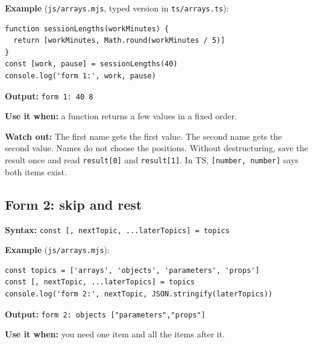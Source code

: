 \documentclass[
  10pt,
  a4paper,
]{article}
\begin{document}
\textbf{Example} (\texttt{js/\allowbreak{}arrays.\allowbreak{}mjs},
typed version in \texttt{ts/\allowbreak{}arrays.\allowbreak{}ts}):

\begin{minipage}{\linewidth}

\begin{lstlisting}
function sessionLengths(workMinutes) {
  return [workMinutes, Math.round(workMinutes / 5)]
}
const [work, pause] = sessionLengths(40)
console.log('form 1:', work, pause)
\end{lstlisting}

\end{minipage}\par

\textbf{Output:} \texttt{form 1:\allowbreak{} 40 8}

\textbf{Use it when:} a function returns a few values in a fixed order.

\textbf{Watch out:} The first name gets the first value. The second name
gets the second value. Names do not choose the positions. Without
destructuring, save the result once and read \texttt{result[0]} and
\texttt{result[1]}. In TS, \texttt{[number, number]} says both items
exist.

\subsection{Form 2: skip and rest}\label{form-2-skip-and-rest}

\textbf{Syntax:}
\texttt{const [, nextTopic, .\allowbreak{}.\allowbreak{}.\allowbreak{}laterTopics] = topics}

\textbf{Example} (\texttt{js/\allowbreak{}arrays.\allowbreak{}mjs}):

\begin{minipage}{\linewidth}

\begin{lstlisting}
const topics = ['arrays', 'objects', 'parameters', 'props']
const [, nextTopic, ...laterTopics] = topics
console.log('form 2:', nextTopic, JSON.stringify(laterTopics))
\end{lstlisting}

\end{minipage}\par

\textbf{Output:}
\texttt{form 2:\allowbreak{} objects ["parameters","props"]}

\textbf{Use it when:} you need one item and all the items after it.
\end{document}
